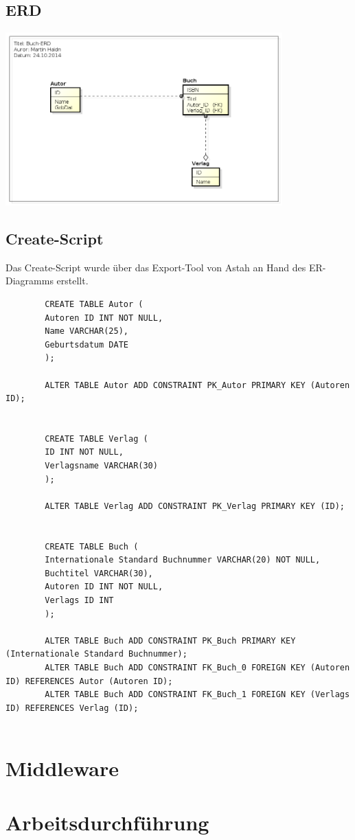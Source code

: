 \documentclass[a4paper]{article}
\begin{document}
	\subsection{ERD}
	\begin{center}
		\includegraphics[width=0.8\textwidth]{img/buch-erd.png}
	\end{center}
	
	\subsection{Create-Script}
	Das Create-Script wurde über das Export-Tool von Astah an Hand des ER-Diagramms erstellt.\\
	\begin{tiny}
		\begin{lstlisting}
		CREATE TABLE Autor (
		Autoren ID INT NOT NULL,
		Name VARCHAR(25),
		Geburtsdatum DATE
		);
		
		ALTER TABLE Autor ADD CONSTRAINT PK_Autor PRIMARY KEY (Autoren ID);
		
		
		CREATE TABLE Verlag (
		ID INT NOT NULL,
		Verlagsname VARCHAR(30)
		);
		
		ALTER TABLE Verlag ADD CONSTRAINT PK_Verlag PRIMARY KEY (ID);
		
		
		CREATE TABLE Buch (
		Internationale Standard Buchnummer VARCHAR(20) NOT NULL,
		Buchtitel VARCHAR(30),
		Autoren ID INT NOT NULL,
		Verlags ID INT
		);
		
		ALTER TABLE Buch ADD CONSTRAINT PK_Buch PRIMARY KEY (Internationale Standard Buchnummer);
		ALTER TABLE Buch ADD CONSTRAINT FK_Buch_0 FOREIGN KEY (Autoren ID) REFERENCES Autor (Autoren ID);
		ALTER TABLE Buch ADD CONSTRAINT FK_Buch_1 FOREIGN KEY (Verlags ID) REFERENCES Verlag (ID);
		
		\end{lstlisting}
	\end{tiny}
	
	\newpage
	\section{Middleware}
	\section{Arbeitsdurchführung}
\end{document}
